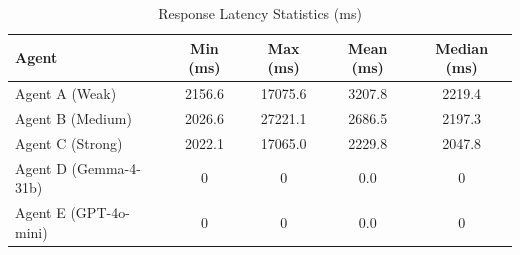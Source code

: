 \begin{table}[ht]
\centering
\caption{Response Latency Statistics (ms)}
\label{tab:timing}
\begin{tabular}{lcccc}
\toprule
Agent & Min (ms) & Max (ms) & Mean (ms) & Median (ms) \\
\midrule
Agent A (Weak) & 2156.6 & 17075.6 & 3207.8 & 2219.4 \\
Agent B (Medium) & 2026.6 & 27221.1 & 2686.5 & 2197.3 \\
Agent C (Strong) & 2022.1 & 17065.0 & 2229.8 & 2047.8 \\
Agent D (Gemma-4-31b) & 0 & 0 & 0.0 & 0 \\
Agent E (GPT-4o-mini) & 0 & 0 & 0.0 & 0 \\
\bottomrule
\end{tabular}
\end{table}
